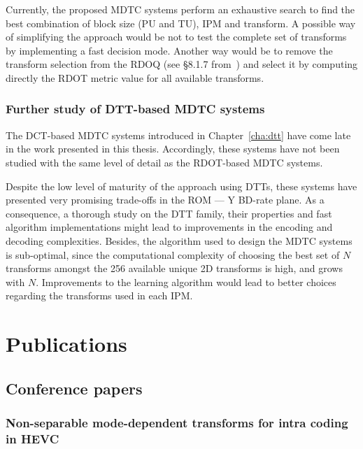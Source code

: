 \documentclass[11pt,a4paper,openright,twoside]{book}
\numberwithin{equation}{section} %
\numberwithin{figure}{section} %
\numberwithin{table}{section} %
\begin{document}
Currently, the proposed \ac{MDTC} systems perform an exhaustive search to find
the best combination of block size (\ac{PU} and \ac{TU}), \ac{IPM} and
transform.
A possible way of simplifying the approach would be not to test the complete
set of transforms by implementing a fast decision mode.
Another way would be to remove the transform selection from the \ac{RDOQ} (see
\S8.1.7 from~\cite{wien-15-hevc}) and select it by computing directly the
\ac{RDOT} metric value for all available transforms.

\subsection*{Further study of \acs{DTT}-based \acs{MDTC} systems}
\label{sub:further_study_of_dtt_based_mdtc_systems}

The \ac{DCT}-based \ac{MDTC} systems introduced in Chapter~\ref{cha:dtt} have
come late in the work presented in this thesis.
Accordingly, these systems have not been studied with the same level of detail
as the \ac{RDOT}-based \ac{MDTC} systems.

Despite the low level of maturity of the approach using \acp{DTT}, these
systems have presented very promising trade-offs in the \acs{ROM} --- Y
\ac{BD}-rate plane.
As a consequence, a thorough study on the \ac{DTT} family, their properties
and fast algorithm implementations might lead to improvements in the encoding
and decoding complexities.
Besides, the algorithm used to design the \ac{MDTC} systems is sub-optimal,
since the computational complexity of choosing the best set of $N$ transforms
amongst the 256 available unique 2D transforms is high, and grows with $N$.
Improvements to the learning algorithm would lead to better choices regarding
the transforms used in each \ac{IPM}.

\appendix

\chapter{Publications}
\label{cha:publications}

\section*{Conference papers}
\label{sec:conference_papers}

\subsection*{Non-separable mode-dependent transforms for intra coding in HEVC}
\end{document}
